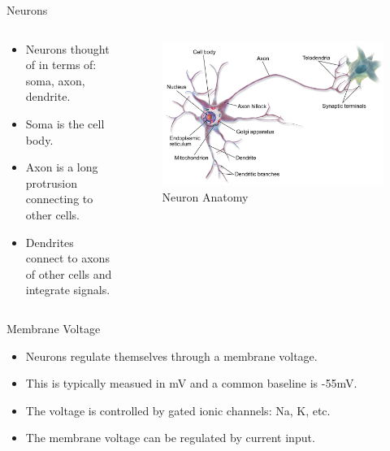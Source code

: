 \documentclass[
  ignorenonframetext,
]{beamer}
\begin{document}
\begin{frame}{Neurons}
\protect\hypertarget{neurons}{}
\begin{columns}[T]
\begin{column}{0.5\textwidth}
\begin{itemize}
\item
  Neurons thought of in terms of: soma, axon, dendrite.
\item
  Soma is the cell body.
\item
  Axon is a long protrusion connecting to other cells.
\item
  Dendrites connect to axons of other cells and integrate signals.
\end{itemize}
\end{column}

\begin{column}{0.5\textwidth}
\begin{figure}

{\centering \includegraphics{./images/neuron_anatomy.png}

}

\caption{Neuron Anatomy}

\end{figure}
\end{column}
\end{columns}
\end{frame}

\begin{frame}{Membrane Voltage}
\protect\hypertarget{membrane-voltage}{}
\begin{itemize}
\item
  Neurons regulate themselves through a membrane voltage.
\item
  This is typically measued in mV and a common baseline is -55mV.
\item
  The voltage is controlled by gated ionic channels: Na, K, etc.
\item
  The membrane voltage can be regulated by current input.
\end{itemize}
\end{frame}
\end{document}
